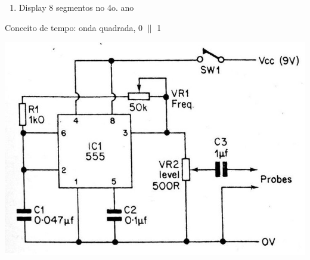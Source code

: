 
\begin{enumerate}
	\item {Display 8 segmentos no 4o. ano}
\end{enumerate}


Conceito de tempo: onda quadrada, 0 $\parallel$ 1

\begin{center}
	\includegraphics[width=\linewidth]{./IMG/ne-555-ajustavel.jpg}
\end{center}